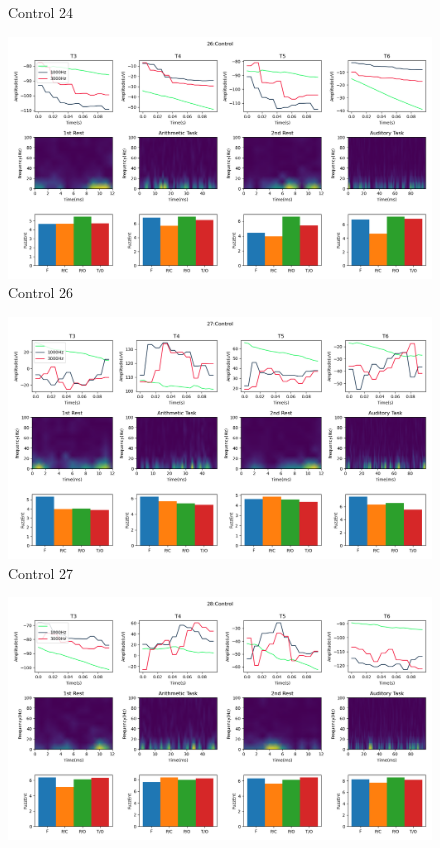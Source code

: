 \documentclass[10pt]{article}
\begin{document}
\begin{landscape}
\begin{figure}
  \caption{Control 24}
  \label{fig:control_24}
\end{figure}
\clearpage
\begin{figure}
  \includegraphics[width=7.2in]{figures/26.png}
  \caption{Control 26}
  \label{fig:control_26}
\end{figure}
\clearpage
\begin{figure}
  \includegraphics[width=7.2in]{figures/27.png}
  \caption{Control 27}
  \label{fig:control_27}
\end{figure}
\clearpage
\begin{figure}
  \includegraphics[width=7.2in]{figures/28.png}

\end{figure}
\end{landscape}
\end{document}
